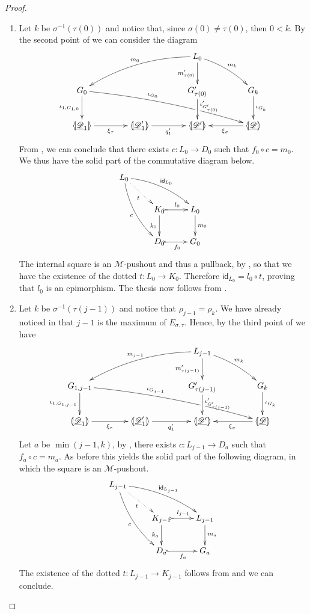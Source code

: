 \documentclass[a4paper]{article}
\newcommand{\id}[1]{\mathsf{id}_{#1}}
\newcommand{\dder}[1]{\mathscr{#1}}
\newcommand{\der}[1]{\underline{\dder{#1}}}
\newcommand{\lpro}{\langle \hspace{-1.85pt}[}
\newcommand{\rpro}{]\hspace{-1.85pt}\rangle}
\newcommand{\tpro}[1]{\lpro \der{#1}\rpro}
\theoremstyle{definition}
\begin{document}
\begin{proof}
	\begin{enumerate}
		\item Let $k$ be $\sigma^{-1}(\tau(0))$ and notice that, since $\sigma(0)\neq \tau(0)$, then $0< k$.  By  the second point of   we can consider the diagram
		\[\xymatrix@C=40pt{&& L_0 \ar[d]_{m'_{\tau(0)}} \ar@/^.2cm/[dr]^{m_{k}} \ar@/_.4cm/[dll]_{m_{0}} \\G_{0} \ar@/^.2cm/[drrr]^(.4){\iota_{G_0}}|(.67)\hole \ar[d]_{\iota_{1,G_{1,0}}}& &G'_{\tau(0)} \ar[d]^(.45){\iota'_{G'_{\tau(0)}}} & G_{k} \ar[d]^{\iota_{G_k}}\\ \lpro\der{D}_1 \rpro \ar[r]_{\xi_{\tau}} &\lpro \der{D}'_1\rpro \ar[r]_{q'_1} & \lpro \der{D'}\rpro & \tpro{D} \ar[l]^{\xi_{\sigma}}}\]
		From , we can conclude that there exists $c\colon L_0\to D_0$ such that $f_0\circ c=m_0$. We thus have the solid part of the commutative diagram below.
		\[\xymatrix{L_0 \ar@/^.3cm/[drr]^{\id{L_0}} \ar@{.>}[dr]_{t} \ar@/_.3cm/[ddr]_{c}\\ & K_0 \ar[d]_{k_0}\ar@{>->}[r]^{l_0}& L_0 \ar[d]^{m_0} \\& D_0 \ar@{>->}[r]_{f_0} & G_0} \]
		The internal square is an $\mathcal{M}$-pushout and thus a pullback, by , so that we have the existence of the dotted $t\colon L_0\to K_0$. Therefore $\id{L_0}=l_0\circ t$, proving that $l_0$ is an epimorphism. The thesis now follows from . 
		\item  Let $k$ be $\sigma^{-1}(\tau(j-1))$ and notice that $\rho_{j-1}=\rho_k$. We have already noticed in  that $j-1$ is the maximum of $E_{\sigma, \tau}$.  Hence, by the third point of  we have
		\[\xymatrix@C=40pt{&& L_{j-1} \ar[d]_{m'_{\tau({j-1})}} \ar@/^.2cm/[dr]^{m_{k}} \ar@/_.4cm/[dll]_{m_{{j-1}}} \\G_{1,{j-1}} \ar@/^.2cm/[drrr]^(.4){\iota_{G_{j-1}}}|(.67)\hole \ar[d]_{\iota_{1,G_{1,j-1}}}& &G'_{\tau({j-1})} \ar[d]^{\iota'_{G'_{\tau({j-1})}}} & G_{k} \ar[d]^{\iota_{G_k}}\\ \lpro\der{D}_1 \rpro \ar[r]_{\xi_{\tau}} &\lpro \der{D}'_1\rpro \ar[r]_{q'_1} & \lpro \der{D'}\rpro & \tpro{D} \ar[l]^{\xi_{\sigma}}}\]
		Let $a$ be $\min(j-1, k)$, by ,  there exists $c\colon L_{j-1}\to D_a$ such that $f_a\circ c=m_a$. As before this yields the solid part of the following diagram, in which the square is an $\mathcal{M}$-pushout.
		\[\xymatrix{L_{j-1} \ar@/^.3cm/[drr]^{\id{L_{j-1}}} \ar@{.>}[dr]_{t} \ar@/_.3cm/[ddr]_{c}\\ & K_{j-1} \ar[d]_{k_a}\ar@{>->}[r]^{l_{j-1}}& L_{j-1} \ar[d]^{m_a} \\& D_a \ar@{>->}[r]_{f_a} & G_a} \]
		The existence of the dotted $t\colon L_{j-1}\to K_{j-1}$ follows from   and we can conclude. \qedhere
	\end{enumerate}
\end{proof}
\end{document}
